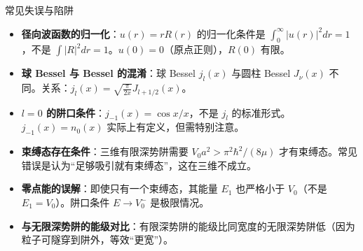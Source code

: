 \begin{errorbox}{常见失误与陷阱}
\begin{itemize}
    \item \textbf{径向波函数的归一化}：$u(r)=rR(r)$ 的归一化条件是 $\int_0^\infty|u(r)|^2dr=1$，不是 $\int|R|^2dr=1$。$u(0)=0$（原点正则），$R(0)$ 有限。
    \item \textbf{球 Bessel 与 Bessel 的混淆}：球 Bessel $j_l(x)$ 与圆柱 Bessel $J_\nu(x)$ 不同。关系：$j_l(x)=\sqrt{\frac{\pi}{2x}}J_{l+1/2}(x)$。
    \item \textbf{$l=0$ 的阱口条件}：$j_{-1}(x)=\cos x/x$，不是 $j_l$ 的标准形式。$j_{-1}(x)=n_0(x)$ 实际上有定义，但需特别注意。
    \item \textbf{束缚态存在条件}：三维有限深势阱需要 $V_0a^2>\pi^2\hbar^2/(8\mu)$ 才有束缚态。常见错误是认为``足够吸引就有束缚态''，这在三维不成立。
    \item \textbf{零点能的误解}：即使只有一个束缚态，其能量 $E_1$ 也严格小于 $V_0$（不是 $E_1=V_0$）。阱口条件 $E\to V_0^-$ 是极限情况。
    \item \textbf{与无限深势阱的能级对比}：有限深势阱的能级比同宽度的无限深势阱低（因为粒子可隧穿到阱外，等效``更宽''）。
\end{itemize}
\end{errorbox}

